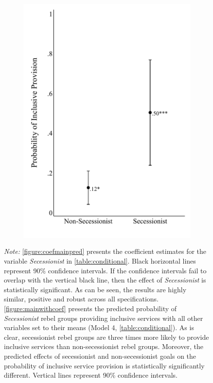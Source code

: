 \documentclass[12pt, letterpaper]{article}
\begin{document}
\begin{figure}[h]
\begin{subfigure}{0.45\textwidth}
    \includegraphics[width=\textwidth]{mainwithcoef.pdf}
    \end{subfigure}
  \begin{tablenotes}
\raggedright \footnotesize{\textit{Note:} \autoref{figure:coefmainpred} presents the coefficient estimates for the variable \textit{Secessionist} in \autoref{table:conditional}. Black horizontal lines represent 90\% confidence intervals. If the confidence intervals fail to overlap with the vertical black line, then the effect of \textit{Secessionist} is statistically significant. As can be seen, the results are highly similar, positive and robust across all specifications. \autoref{figure:mainwithcoef} presents the predicted probability of \textit{Secessionist} rebel groups providing inclusive services with all other variables set to their means (Model 4, \autoref{table:conditional}). As is clear, secessionist rebel groups are three times more likely to provide inclusive services than non-secessionist rebel groups. Moreover, the predicted effects of secessionist and non-secessionist goals on the probability of inclusive service provision is statistically significantly different. Vertical lines represent 90\% confidence intervals.}
\end{tablenotes}
\end{figure}
\end{document}
